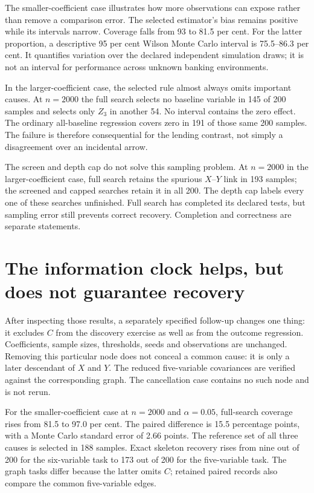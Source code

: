 The smaller-coefficient case illustrates how more observations can expose
rather than remove a comparison error. The selected estimator's bias remains
positive while its intervals narrow. Coverage falls from 93 to 81.5 per cent.
For the latter proportion, a descriptive 95 per cent Wilson Monte Carlo
interval is 75.5--86.3 per cent. It quantifies variation over the declared
independent simulation draws; it is not an interval for performance across
unknown banking environments.

In the larger-coefficient case, the selected rule almost always omits important
causes. At $n=2000$ the full search selects no baseline variable in 145 of 200
samples and selects only $Z_3$ in another 54. No interval contains the zero
effect. The ordinary all-baseline regression covers zero in 191 of those same
200 samples. The failure is therefore consequential for the lending contrast,
not simply a disagreement over an incidental arrow.

The screen and depth cap do not solve this sampling problem. At $n=2000$ in
the larger-coefficient case, full search retains the spurious $X$--$Y$ link in
193 samples; the screened and capped searches retain it in all 200. The depth
cap labels every one of these searches unfinished. Full search has completed
its declared tests, but sampling error still prevents correct recovery.
Completion and correctness are separate statements.

\section{The information clock helps, but does not guarantee recovery}

After inspecting those results, a separately specified follow-up changes one
thing: it excludes $C$ from the discovery exercise as well as from the outcome
regression. Coefficients, sample sizes, thresholds, seeds and observations are
unchanged. Removing this particular node does not conceal a common cause:
it is only a later descendant of $X$ and $Y$. The reduced five-variable
covariances are verified against the corresponding graph. The cancellation
case contains no such node and is not rerun.

For the smaller-coefficient case at $n=2000$ and $\alpha=0.05$, full-search
coverage rises from 81.5 to 97.0 per cent. The paired difference is 15.5
percentage points, with a Monte Carlo standard error of 2.66 points. The
reference set of all three causes is selected in 188 samples. Exact skeleton
recovery rises from nine out of 200 for the six-variable task to 173 out of
200 for the five-variable task. The graph tasks differ because the latter
omits $C$; retained paired records also compare the common five-variable edges.

